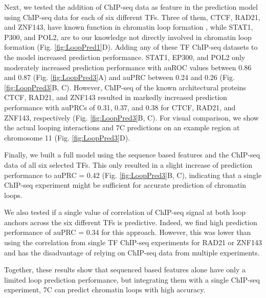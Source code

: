 \documentclass[a4paper,twoside=true,openright,parskip=full,chapterprefix=true,11pt,headings=normal,bibliography=totoc,listof=totoc,titlepage=on,captions=tableabove,draft=false]{scrreprt}
\theoremstyle{definition}
\theoremstyle{definition}
\theoremstyle{definition}
\theoremstyle{remark}
\begin{document}
Next, we tested the addition of ChIP-seq data as feature in the
prediction model using ChIP-seq data for each of six different TFs.
Three of them, CTCF, RAD21, and ZNF143, have known function in chromatin
loop formation \citep{Merkenschlager2016, Ye2016b, Bailey2015}, while
STAT1, P300, and POL2, are to our knowledge not directly involved in
chromatin loop formation (Fig. \ref{fig:LoopPred1}D). Adding any of
these TF ChIP-seq datasets to the model increased prediction
performance. STAT1, EP300, and POL2 only moderately increased prediction
performance with auROC values between 0.86 and 0.87 (Fig.
\ref{fig:LoopPred3}A) and auPRC between 0.24 and 0.26 (Fig.
\ref{fig:LoopPred3}B, C). However, ChIP-seq of the known architectural
proteins CTCF, RAD21, and ZNF143 resulted in markedly increased
prediction performance with auPRCs of 0.31, 0.37, and 0.38 for CTCF,
RAD21, and ZNF143, respectively (Fig. \ref{fig:LoopPred3}B, C). For
visual comparison, we show the actual looping interactions and 7C
predictions on an example region at chromosome 11 (Fig.
\ref{fig:LoopPred3}D).

Finally, we built a full model using the sequence based features and the
ChIP-seq data of all six selected TFs. This only resulted in a slight
increase of prediction performance to auPRC = 0.42 (Fig.
\ref{fig:LoopPred3}B, C), indicating that a single ChIP-seq experiment
might be sufficient for accurate prediction of chromatin loops.

We also tested if a single value of correlation of ChIP-seq signal at
both loop anchors across the six different TFs is predictive. Indeed, we
find high prediction performance of auPRC = 0.34 for this approach.
However, this was lower than using the correlation from single TF
ChIP-seq experiments for RAD21 or ZNF143 and has the disadvantage of
relying on ChIP-seq data from multiple experiments.

Together, these results show that sequenced based features alone have
only a limited loop prediction performance, but integrating them with a
single ChIP-seq experiment, 7C can predict chromatin loops with high
accuracy.
\end{document}
